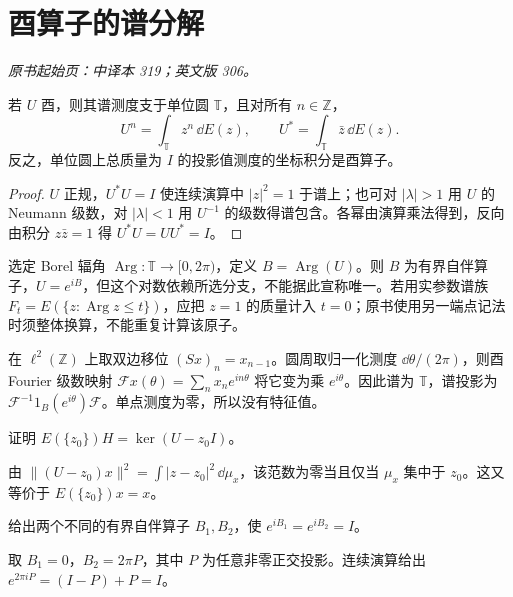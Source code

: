 \section{酉算子的谱分解}\label{sec:yosida-11-04}
\noindent\textit{原书起始页：中译本 319；英文版 306。}

\begin{theorem}[单位圆上的谱积分]\label{thm:y11-unitary-pvm}
若 $U$ 酉，则其谱测度支于单位圆 $\mathbb T$，且对所有 $n\in\mathbb Z$，
\[
 U^n=\int_{\mathbb T}z^n\,\dd E(z),\qquad U^*=\int_{\mathbb T}\bar z\,\dd E(z).
\]
反之，单位圆上总质量为 $I$ 的投影值测度的坐标积分是酉算子。
\end{theorem}
\begin{proof}
$U$ 正规，$U^*U=I$ 使连续演算中 $|z|^2=1$ 于谱上；也可对 $|\lambda|>1$ 用 $U$ 的 Neumann 级数，对 $|\lambda|<1$ 用 $U^{-1}$ 的级数得谱包含。各幂由演算乘法得到，反向由积分 $z\bar z=1$ 得 $U^*U=UU^*=I$。
\end{proof}

选定 Borel 辐角 $\operatorname{Arg}:\mathbb T\to[0,2\pi)$，定义 $B=\operatorname{Arg}(U)$。则 $B$ 为有界自伴算子，$U=e^{iB}$，但这个对数依赖所选分支，不能据此宣称唯一。若用实参数谱族 $F_t=E(\{z:\operatorname{Arg}z\le t\})$，应把 $z=1$ 的质量计入 $t=0$；原书使用另一端点记法时须整体换算，不能重复计算该原子。

\begin{example}[平移的谱表示]
在 $\ell^2(\mathbb Z)$ 上取双边移位 $(Sx)_n=x_{n-1}$。圆周取归一化测度 $\dd\theta/(2\pi)$，则酉 Fourier 级数映射 $\mathcal Fx(\theta)=\sum_nx_ne^{in\theta}$ 将它变为乘 $e^{i\theta}$。因此谱为 $\mathbb T$，谱投影为 $\mathcal F^{-1}1_B(e^{i\theta})\mathcal F$。单点测度为零，所以没有特征值。
\end{example}

\begin{exercise}[谱投影的原子]\label{ex:y11-unitary-atom}
证明 $E(\{z_0\})H=\ker(U-z_0I)$。
\end{exercise}
\begin{solution}
由 $\|(U-z_0)x\|^2=\int|z-z_0|^2\,\dd\mu_x$，该范数为零当且仅当 $\mu_x$ 集中于 $z_0$。这又等价于 $E(\{z_0\})x=x$。
\end{solution}

\begin{exercise}[酉对数不唯一]\label{ex:y11-unitary-log}
给出两个不同的有界自伴算子 $B_1,B_2$，使 $e^{iB_1}=e^{iB_2}=I$。
\end{exercise}
\begin{solution}
取 $B_1=0$，$B_2=2\pi P$，其中 $P$ 为任意非零正交投影。连续演算给出 $e^{2\pi iP}=(I-P)+P=I$。
\end{solution}
